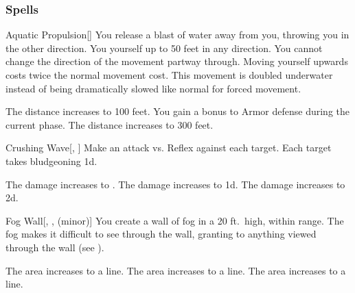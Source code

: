 \subsubsection{Spells}


\lowercase{\hypertarget{spell:Aquatic Propulsion}{}}\label{spell:Aquatic Propulsion}
\begin{freeability}[Rank 1]{\hypertarget{spell:Aquatic Propulsion}{Aquatic Propulsion}}[]
You release a blast of water away from you, throwing you in the other direction.
You  yourself up to 50 feet in any direction.
You cannot change the direction of the movement partway through.
Moving yourself upwards costs twice the normal movement cost.
This movement is doubled underwater instead of being dramatically slowed like normal for forced movement.

\rankline
{} The distance increases to 100 feet.
 You gain a  bonus to Armor defense during the current phase.
 The distance increases to 300 feet.
\end{freeability}
\vspace{0.25em}



\lowercase{\hypertarget{spell:Crushing Wave}{}}\label{spell:Crushing Wave}
\begin{freeability}[Rank 1]{\hypertarget{spell:Crushing Wave}{Crushing Wave}}[, ]
Make an attack vs. Reflex against each target.
\hit Each target takes bludgeoning  \minus1d.

\rankline
{} The damage increases to .
 The damage increases to  \plus1d.
 The damage increases to  \plus2d.
\end{freeability}
\vspace{0.25em}



\lowercase{\hypertarget{spell:Fog Wall}{}}\label{spell:Fog Wall}
\begin{freeability}[Rank 1]{\hypertarget{spell:Fog Wall}{Fog Wall}}[, ,  (minor)]
\targetrule
You create a wall of fog in a 20 ft.\ high, \arealarge {} within \rngmed range.
The fog makes it difficult to see through the wall, granting  to anything viewed through the wall (see ).

\rankline
{} The area increases to a \arealarge line.
 The area increases to a \areahuge line.
 The area increases to a \areaext line.
\end{freeability}
\vspace{0.25em}



